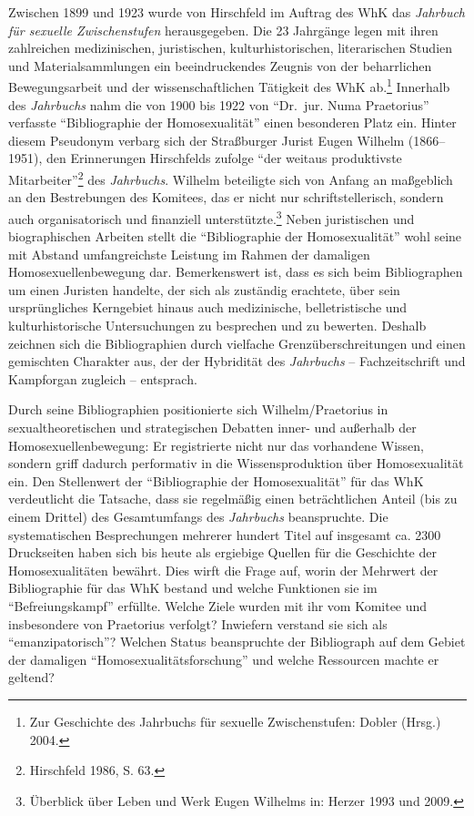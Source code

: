 \documentclass[a4paper,
fontsize=11pt,
oneside,
numbers=noperiodatend,
parskip=half-,
bibliography=totoc,
final
]{scrartcl}
\begin{document}
Zwischen 1899 und 1923 wurde von Hirschfeld im Auftrag des WhK das
\emph{Jahrbuch für sexuelle Zwischenstufen} herausgegeben. Die 23
Jahrgänge legen mit ihren zahlreichen medizinischen, juristischen,
kulturhistorischen, literarischen Studien und Materialsammlungen ein
beeindruckendes Zeugnis von der beharrlichen Bewegungsarbeit und der
wissenschaftlichen Tätigkeit des WhK ab.\footnote{Zur Geschichte des
  Jahrbuchs für sexuelle Zwischenstufen: Dobler (Hrsg.) 2004.} Innerhalb
des \emph{Jahrbuchs} nahm die von 1900 bis 1922 von \enquote{Dr.~jur.
Numa Praetorius} verfasste \enquote{Bibliographie der Homosexualität}
einen besonderen Platz ein. Hinter diesem Pseudonym verbarg sich der
Straßburger Jurist Eugen Wilhelm (1866--1951), den Erinnerungen
Hirschfelds zufolge \enquote{der weitaus produktivste
Mitarbeiter}\footnote{Hirschfeld 1986, S. 63.} des \emph{Jahrbuchs}.
Wilhelm beteiligte sich von Anfang an maßgeblich an den Bestrebungen des
Komitees, das er nicht nur schriftstellerisch, sondern auch
organisatorisch und finanziell unterstützte.\footnote{Überblick über
  Leben und Werk Eugen Wilhelms in: Herzer 1993 und 2009.} Neben
juristischen und biographischen Arbeiten stellt die
\enquote{Bibliographie der Homosexualität} wohl seine mit Abstand
umfangreichste Leistung im Rahmen der damaligen Homosexuellenbewegung
dar. Bemerkenswert ist, dass es sich beim Bibliographen um einen
Juristen handelte, der sich als zuständig erachtete, über sein
ursprüngliches Kerngebiet hinaus auch medizinische, belletristische und
kulturhistorische Untersuchungen zu besprechen und zu bewerten. Deshalb
zeichnen sich die Bibliographien durch vielfache Grenzüberschreitungen
und einen gemischten Charakter aus, der der Hybridität des
\emph{Jahrbuchs} -- Fachzeitschrift und Kampforgan zugleich --
entsprach.

Durch seine Bibliographien positionierte sich Wilhelm/Praetorius in
sexualtheoretischen und strategischen Debatten inner- und außerhalb der
Homosexuellenbewegung: Er registrierte nicht nur das vorhandene Wissen,
sondern griff dadurch performativ in die Wissensproduktion über
Homosexualität ein. Den Stellenwert der \enquote{Bibliographie der
Homosexualität} für das WhK verdeutlicht die Tatsache, dass sie
regelmäßig einen beträchtlichen Anteil (bis zu einem Drittel) des
Gesamtumfangs des \emph{Jahrbuchs} beanspruchte. Die systematischen
Besprechungen mehrerer hundert Titel auf insgesamt ca. 2300 Druckseiten
haben sich bis heute als ergiebige Quellen für die Geschichte der
Homosexualitäten bewährt. Dies wirft die Frage auf, worin der Mehrwert
der Bibliographie für das WhK bestand und welche Funktionen sie im
\enquote{Befreiungskampf} erfüllte. Welche Ziele wurden mit ihr vom
Komitee und insbesondere von Praetorius verfolgt? Inwiefern verstand sie
sich als \enquote{emanzipatorisch}? Welchen Status beanspruchte der
Bibliograph auf dem Gebiet der damaligen
\enquote{Homosexualitätsforschung} und welche Ressourcen machte er
geltend?
\end{document}
